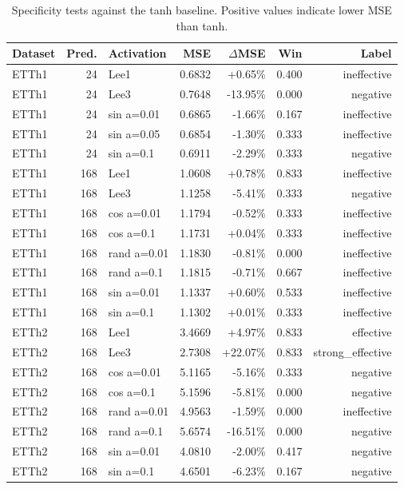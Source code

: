 \begin{table}[t]
\centering
\caption{Specificity tests against the tanh baseline. Positive values indicate lower MSE than tanh.}
\label{tab:tanh_specificity}
\begin{tabular}{lrlrrrr}
\toprule
Dataset & Pred. & Activation & MSE & $\Delta$MSE & Win & Label \\
\midrule
ETTh1 & 24 & Lee1 & 0.6832 & +0.65\% & 0.400 & ineffective \\
ETTh1 & 24 & Lee3 & 0.7648 & -13.95\% & 0.000 & negative \\
ETTh1 & 24 & sin a=0.01 & 0.6865 & -1.66\% & 0.167 & ineffective \\
ETTh1 & 24 & sin a=0.05 & 0.6854 & -1.30\% & 0.333 & ineffective \\
ETTh1 & 24 & sin a=0.1 & 0.6911 & -2.29\% & 0.333 & negative \\
ETTh1 & 168 & Lee1 & 1.0608 & +0.78\% & 0.833 & ineffective \\
ETTh1 & 168 & Lee3 & 1.1258 & -5.41\% & 0.333 & negative \\
ETTh1 & 168 & cos a=0.01 & 1.1794 & -0.52\% & 0.333 & ineffective \\
ETTh1 & 168 & cos a=0.1 & 1.1731 & +0.04\% & 0.333 & ineffective \\
ETTh1 & 168 & rand a=0.01 & 1.1830 & -0.81\% & 0.000 & ineffective \\
ETTh1 & 168 & rand a=0.1 & 1.1815 & -0.71\% & 0.667 & ineffective \\
ETTh1 & 168 & sin a=0.01 & 1.1337 & +0.60\% & 0.533 & ineffective \\
ETTh1 & 168 & sin a=0.1 & 1.1302 & +0.01\% & 0.333 & ineffective \\
ETTh2 & 168 & Lee1 & 3.4669 & +4.97\% & 0.833 & effective \\
ETTh2 & 168 & Lee3 & 2.7308 & +22.07\% & 0.833 & strong\_effective \\
ETTh2 & 168 & cos a=0.01 & 5.1165 & -5.16\% & 0.333 & negative \\
ETTh2 & 168 & cos a=0.1 & 5.1596 & -5.81\% & 0.000 & negative \\
ETTh2 & 168 & rand a=0.01 & 4.9563 & -1.59\% & 0.000 & ineffective \\
ETTh2 & 168 & rand a=0.1 & 5.6574 & -16.51\% & 0.000 & negative \\
ETTh2 & 168 & sin a=0.01 & 4.0810 & -2.00\% & 0.417 & negative \\
ETTh2 & 168 & sin a=0.1 & 4.6501 & -6.23\% & 0.167 & negative \\

\end{tabular}
\end{table}
